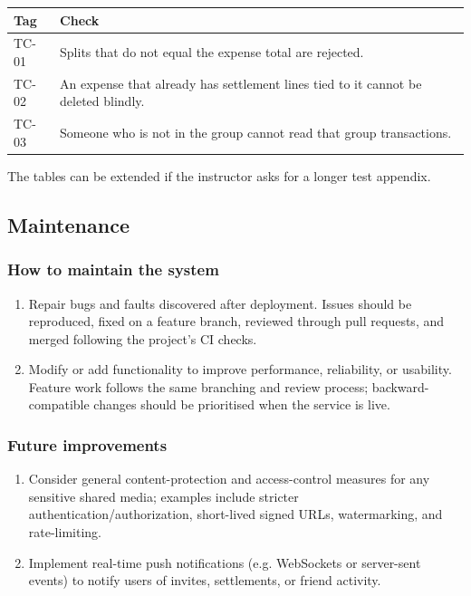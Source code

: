 \documentclass[11pt,a4paper]{article}
\begin{document}
\begin{center}
\begin{tabular}{@{}p{}p{}@{}}
\toprule
\textbf{Tag} & \textbf{Check} \\
\midrule
TC-01 & Splits that do not equal the expense total are rejected. \\
TC-02 & An expense that already has settlement lines tied to it cannot be deleted blindly. \\
TC-03 & Someone who is not in the group cannot read that group transactions. \\
\bottomrule
\end{tabular}
\end{center}

\noindent The tables can be extended if the instructor asks for a longer test appendix.

\subsection{Maintenance}

\subsubsection{How to maintain the system}
\begin{enumerate}
	\item Repair bugs and faults discovered after deployment. Issues should be reproduced, fixed on a feature branch, reviewed through pull requests, and merged following the project's CI checks.
	\item Modify or add functionality to improve performance, reliability, or usability. Feature work follows the same branching and review process; backward-compatible changes should be prioritised when the service is live.
\end{enumerate}

\subsubsection{Future improvements}
\begin{enumerate}
  \item Consider general content-protection and access-control measures for any sensitive shared media; examples include stricter authentication/authorization, short-lived signed URLs, watermarking, and rate-limiting.
  \item Implement real-time push notifications (e.g. WebSockets or server-sent events) to notify users of invites, settlements, or friend activity.
\end{enumerate}
\end{document}
